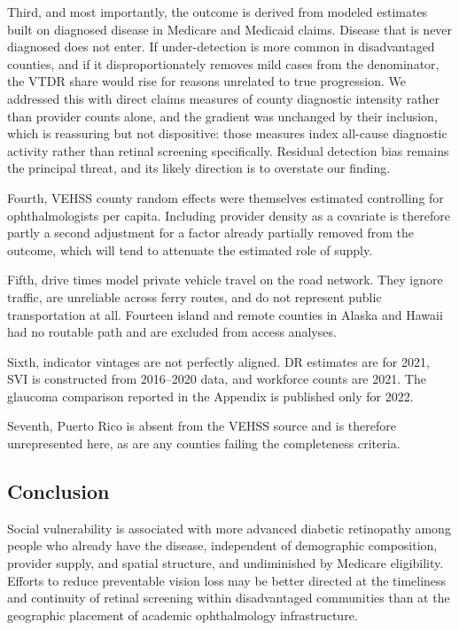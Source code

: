 \documentclass[11pt]{article}
\begin{document}
Third, and most importantly, the outcome is derived from modeled estimates
built on diagnosed disease in Medicare and Medicaid claims. Disease that is
never diagnosed does not enter. If under-detection is more common in
disadvantaged counties, and if it disproportionately removes mild cases from the
denominator, the VTDR share would rise for reasons unrelated to true
progression. We addressed this with direct claims measures of county diagnostic
intensity rather than provider counts alone, and the gradient was unchanged by
their inclusion, which is reassuring but not dispositive: those measures index
all-cause diagnostic activity rather than retinal screening specifically.
Residual detection bias remains the principal threat, and its likely direction
is to overstate our finding.

Fourth, VEHSS county random effects were themselves estimated controlling for
ophthalmologists per capita. Including provider density as a covariate is
therefore partly a second adjustment for a factor already partially removed from
the outcome, which will tend to attenuate the estimated role of supply.

Fifth, drive times model private vehicle travel on the road network. They
ignore traffic, are unreliable across ferry routes, and do not represent public
transportation at all. Fourteen island and remote counties in Alaska and Hawaii
had no routable path and are excluded from access analyses.

Sixth, indicator vintages are not perfectly aligned. DR estimates are for 2021,
SVI is constructed from 2016--2020 data, and workforce counts are 2021. The
glaucoma comparison reported in the Appendix is published only for 2022.

Seventh, Puerto Rico is absent from the VEHSS source and is therefore unrepresented
here, as are any counties failing the completeness criteria.

\subsection{Conclusion}

Social vulnerability is associated with more advanced diabetic retinopathy among
people who already have the disease, independent of demographic composition,
provider supply, and spatial structure, and undiminished by Medicare
eligibility. Efforts to reduce preventable vision loss may be better directed at
the timeliness and continuity of retinal screening within disadvantaged
communities than at the geographic placement of academic ophthalmology
infrastructure.
\end{document}
